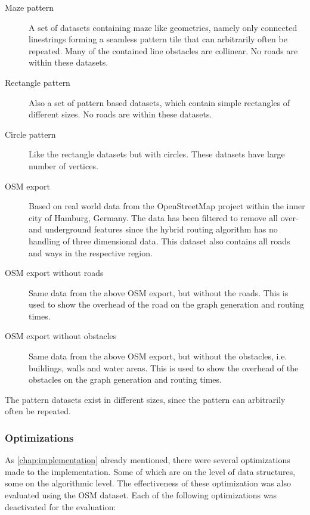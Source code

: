 			\begin{description}
				\item[Maze pattern] A set of datasets containing maze like geometries, namely only connected linestrings forming a seamless pattern tile that can arbitrarily often be repeated. Many of the contained line obstacles are collinear. No roads are within these datasets.
				\item[Rectangle pattern] Also a set of pattern based datasets, which contain simple rectangles of different sizes. No roads are within these datasets.
				\item[Circle pattern] Like the rectangle datasets but with circles. These datasets have large number of vertices.
				\item[OSM export] Based on real world data from the OpenStreetMap project within the inner city of Hamburg, Germany. The data has been filtered to remove all over- and underground features since the hybrid routing algorithm has no handling of three dimensional data. This dataset also contains all roads and ways in the respective region.
				\item[OSM export without roads] Same data from the above OSM export, but without the roads. This is used to show the overhead of the road on the graph generation and routing times.
				\item[OSM export without obstacles] Same data from the above OSM export, but without the obstacles, i.e. buildings, walls and water areas. This is used to show the overhead of the obstacles on the graph generation and routing times.
			\end{description}
			
			The pattern datasets exist in different sizes, since the pattern can arbitrarily often be repeated.
			
			
		
		\subsubsection{Optimizations}
		
			As \cref{chap:implementation} already mentioned, there were several optimizations made to the implementation.
			Some of which are on the level of data structures, some on the algorithmic level.
			The effectiveness of these optimization was also evaluated using the OSM dataset.
			Each of the following optimizations was deactivated for the evaluation:

